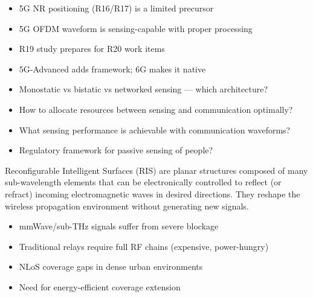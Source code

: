 
\begin{itemize}
\tightlist
\item
  5G NR positioning (R16/\allowbreak{}R17) is a limited precursor
\item
  5G OFDM waveform is sensing-capable with proper processing
\item
  R19 study prepares for R20 work items
\item
  5G-Advanced adds framework; 6G makes it native
\end{itemize}


\begin{itemize}
\tightlist
\item
  Monostatic vs bistatic vs networked sensing — which architecture?
\item
  How to allocate resources between sensing and communication optimally?
\item
  What sensing performance is achievable with communication waveforms?
\item
  Regulatory framework for passive sensing of people?
\end{itemize}



\CNchained{}

\CNchained{}

Reconfigurable Intelligent Surfaces (RIS) are planar structures composed of many sub-wavelength elements that can be electronically controlled to reflect (or refract) incoming electromagnetic waves in desired directions. They reshape the wireless propagation environment without generating new signals.


\begin{itemize}
\tightlist
\item
  mmWave/\allowbreak{}sub-THz signals suffer from severe blockage
\item
  Traditional relays require full RF chains (expensive, power-hungry)
\item
  NLoS coverage gaps in dense urban environments
\item
  Need for energy-efficient coverage extension
\end{itemize}

